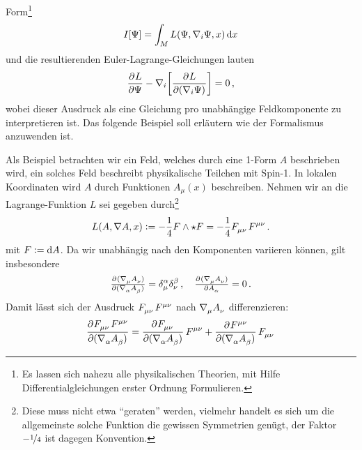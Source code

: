 Form\footnote{Es lassen sich nahezu alle physikalischen
Theorien, mit Hilfe Differentialgleichungen erster Ordnung Formulieren.}
\begin{equation}
I[\Psi]=\int_M L\left(\Psi,\nabla_i \Psi,x\right)\dif x
\end{equation}
und die resultierenden Euler-Lagrange-Gleichungen lauten
\begin{equation}
\dpd{L}{\Psi}
-\nabla_i\left[\dpd{L}{(\nabla_i\Psi)}\right]=0\,,
\end{equation}
wobei dieser Ausdruck als eine Gleichung pro
unabhängige Feldkomponente zu interpretieren ist. Das folgende Beispiel soll
erläutern wie der Formalismus anzuwenden ist.
\begin{beispiel} \label{bsp:Spinone}
Als Beispiel betrachten wir ein Feld, welches durch eine
1-Form $A$ beschrieben wird, ein solches Feld beschreibt physikalische Teilchen
mit Spin-1.
In lokalen Koordinaten wird $A$ durch Funktionen $A_\mu(x)$ beschreiben.
Nehmen wir an die Lagrange-Funktion $L$ sei gegeben durch\footnote{Diese muss
nicht etwa "`geraten"' werden, vielmehr handelt es sich um die allgemeinste
solche Funktion die gewissen Symmetrien genügt, der Faktor $-\nicefrac{1}{4}$ ist dagegen
Konvention.}
\begin{equation}
L(A,\nabla A,x):=-\frac{1}{4}F\wedge
\star F=-\frac{1}{4}\tensor{F}{_\mu_\nu}\tensor{F}{^\mu^\nu}\,.
\end{equation}
mit
$F:=\dif A$. Da wir unabhängig nach den Komponenten variieren können, gilt
insbesondere
\begin{equation}
\pd{(\tensor{\nabla}{_\mu}\tensor{A}{_\nu})}{(\tensor{\nabla}{_\alpha}\tensor{A}{_\beta})}
=\tensor*{\delta}{^\alpha_\mu}\tensor*{\delta}{^\beta_\nu}\,,\quad
\pd{(\tensor{\nabla}{_\mu}\tensor{A}{_\nu})}{\tensor{A}{_\alpha}}=0\,.
\end{equation}
Damit lässt sich der Ausdruck $\tensor{F}{_\mu_\nu}\tensor{F}{^\mu^\nu}$ nach
$\tensor{\nabla}{_\mu}\tensor{A}{_\nu}$ differenzieren:
\begin{equation}
\begin{split}
\dpd{\tensor{F}{_\mu_\nu}\tensor{F}{^\mu^\nu}}{(\tensor{\nabla}{_\alpha}\tensor{A}{_\beta})}
&=\dpd{\tensor{F}{_\mu_\nu}}{(\tensor{\nabla}{_\alpha}\tensor{A}{_\beta})}\tensor{F}{^\mu^\nu}
 +\dpd{\tensor{F}{^\mu^\nu}}{(\tensor{\nabla}{_\alpha}\tensor{A}{_\beta})}\tensor{F}{_\mu_\nu}
 \\

\end{split}
\end{equation}
\end{beispiel}
